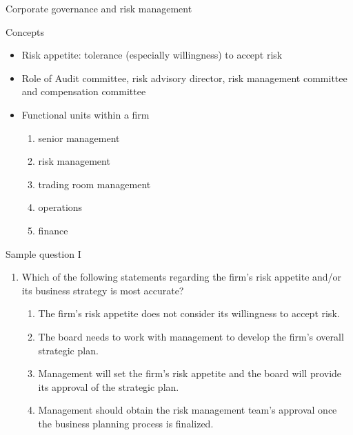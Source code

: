\begin{frame}[allowframebreaks]{Corporate governance and risk management}
\begin{block}{Concepts}
	\begin{itemize}
		\item Risk appetite: tolerance (especially willingness) to accept risk
		\item Role of Audit committee, risk advisory director, risk management committee and compensation committee
		\item Functional units within a firm 
		\begin{enumerate}
			\item senior management
			\item risk management
			\item trading room management
			\item operations
			\item finance
		\end{enumerate}
	\end{itemize}
\end{block}

\end{frame}

\begin{frame}{Sample question I}

\begin{enumerate}
	\item Which of the following statements regarding the firm's risk appetite and/or its
	business strategy is most accurate?
	\begin{enumerate}[A]
		\item The firm's risk appetite does not consider its willingness to accept risk.
		\item {\color{red} The board needs to work with management to develop the firm's overall strategic
		plan.}
		\item Management will set the firm's risk appetite and the board will provide its
		approval of the strategic plan.
		\item Management should obtain the risk management team's approval once the
		business planning process is finalized.
	\end{enumerate}
\end{enumerate}

\end{frame}

